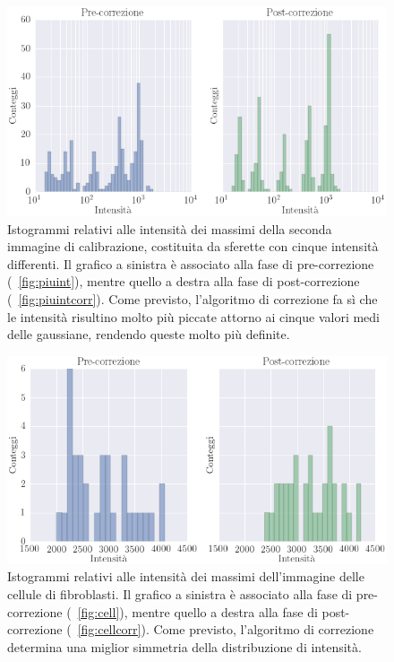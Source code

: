 \begin{figure}
 \centering
 \includegraphics[scale=.55]{img/CAP4isto2.png}
 \caption{\small{Istogrammi relativi alle intensità dei massimi della seconda immagine di calibrazione, costituita da sferette con cinque intensità differenti. Il grafico a sinistra è associato alla fase di pre-correzione (\figurename~\ref{fig:piuint}), mentre quello a destra alla fase di post-correzione (\figurename~\ref{fig:piuintcorr}). Come previsto, l'algoritmo di correzione fa sì che le intensità risultino molto più piccate attorno ai cinque valori medi delle gaussiane, rendendo queste molto più definite.}}
 \label{fig:isto2}
\end{figure}

\begin{figure}
 \centering
 \includegraphics[scale=.55]{img/CAP4isto3.png}
 \caption{\small{Istogrammi relativi alle intensità dei massimi dell'immagine delle cellule di fibroblasti. Il grafico a sinistra è associato alla fase di pre-correzione (\figurename~\ref{fig:cell}), mentre quello a destra alla fase di post-correzione (\figurename~\ref{fig:cellcorr}). Come previsto, l'algoritmo di correzione determina una miglior simmetria della distribuzione di intensità.}}
 \label{fig:isto3}
\end{figure}


